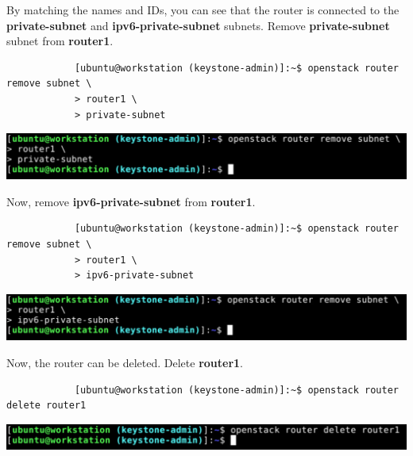 \documentclass[letterpaper, 12pt]{article}
\begin{document}
\begin{enumerate}
    \begin{labstep}
        By matching the names and IDs, you can see that the router is connected to the \textbf{private-subnet} and \textbf{ipv6-private-subnet} subnets.
        Remove \textbf{private-subnet} subnet from \textbf{router1}.
        \begin{lstlisting}
            [ubuntu@workstation (keystone-admin)]:~$ openstack router remove subnet \
            > router1 \
            > private-subnet
        \end{lstlisting}

        \begin{center}
            \includegraphics[width=\linewidth]{images/part1/step8.png}
        \end{center}
    \end{labstep}

    \begin{labstep}
        Now, remove \textbf{ipv6-private-subnet} from \textbf{router1}.
        \begin{lstlisting}
            [ubuntu@workstation (keystone-admin)]:~$ openstack router remove subnet \
            > router1 \
            > ipv6-private-subnet
        \end{lstlisting}

        \begin{center}
            \includegraphics[width=\linewidth]{images/part1/step9.png}
        \end{center}
    \end{labstep}

    \begin{labstep}
        Now, the router can be deleted.
        Delete \textbf{router1}.
        \begin{lstlisting}
            [ubuntu@workstation (keystone-admin)]:~$ openstack router delete router1
        \end{lstlisting}

        \begin{center}
            \includegraphics[width=\linewidth]{images/part1/step10.png}
        \end{center}
    \end{labstep}


\end{enumerate}
\end{document}
